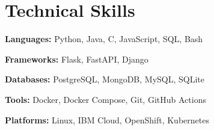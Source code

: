 \section{Technical Skills}

\begin{itemize}[leftmargin=0.15in, label={}]
\small{\item{

\textbf{Languages:} Python, Java, C, JavaScript, SQL, Bash  

\textbf{Frameworks:} Flask, FastAPI, Django  

\textbf{Databases:} PostgreSQL, MongoDB, MySQL, SQLite  

\textbf{Tools:} Docker, Docker Compose, Git, GitHub Actions  

\textbf{Platforms:} Linux, IBM Cloud, OpenShift, Kubernetes

}}
\end{itemize}